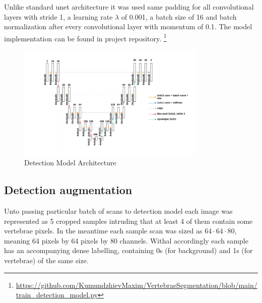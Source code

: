 Unlike standard unet architecture it was used same padding for all convolutional layers with stride 1, a learning rate
$\lambda$ of 0.001, a batch size of 16 and batch normalization after every convolutional layer with momentum of 0.1. The model implementation can be found in project repository.
\footnote{ \url{https://github.com/KumundzhievMaxim/VertebraeSegmentation/blob/main/train_detection_model.py}}

\begin{figure}[h]
    \centering \includegraphics[width=9cm]{images/detection_model.png}
    \caption {Detection Model Architecture}
    \label{fig:detection_model}
\end{figure}
 
\subsection{Detection augmentation}
Unto passing particular batch of scans to detection model each image was represented as 5 cropped samples intruding that at least 4 of them contain some vertebrae pixels. In the meantime each sample scan was sized as $64 \cdot 64 \cdot 80$, meaning 64 pixels by 64 pixels by 80 channels. Withal accordingly each sample has an accompanying dense labelling, containing 0s (for background) and 1s (for vertebrae) of the same size.    
 
